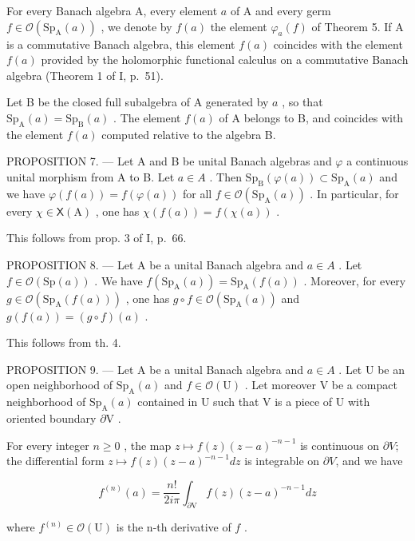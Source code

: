 For every Banach algebra A, every element \(a\) of A and every germ \(f \in \mathcal{O}(\mathrm{Sp}_{\mathrm{A}}(a))\) , we denote by \(f(a)\) the element \(\varphi_{a}(f)\) of Theorem 5. If A is a commutative Banach algebra, this element \(f(a)\) coincides with the element \(f(a)\) provided by the holomorphic functional calculus on a commutative Banach algebra (Theorem 1 of I, p.~51).

Let B be the closed full subalgebra of A generated by \(a\) , so that \(\mathrm{Sp}_{\mathrm{A}}(a) = \mathrm{Sp}_{\mathrm{B}}(a)\) . The element \(f(a)\) of A belongs to B, and coincides with the element \(f(a)\) computed relative to the algebra B.

PROPOSITION 7. --- Let A and B be unital Banach algebras and \(\varphi\) a continuous unital morphism from A to B. Let \(a \in A\) . Then \(\mathrm{Sp}_{\mathrm{B}}(\varphi(a)) \subset \mathrm{Sp}_{\mathrm{A}}(a)\) and we have \(\varphi(f(a)) = f(\varphi(a))\) for all \(f \in \mathcal{O}(\mathrm{Sp}_{\mathrm{A}}(a))\) . In particular, for every \(\chi \in \mathsf{X}(\mathrm{A})\) , one has \(\chi(f(a)) = f(\chi(a))\) .

This follows from prop. 3 of I, p.~66.

PROPOSITION 8. --- Let A be a unital Banach algebra and \(a \in A\) . Let \(f \in \mathcal{O}(\mathrm{Sp}(a))\) . We have \(f(\mathrm{Sp}_{\mathrm{A}}(a)) = \mathrm{Sp}_{\mathrm{A}}(f(a))\) . Moreover, for every \(g \in \mathcal{O}(\mathrm{Sp}_{\mathrm{A}}(f(a)))\) , one has \(g \circ f \in \mathcal{O}(\mathrm{Sp}_{\mathrm{A}}(a))\) and \(g(f(a)) = (g \circ f)(a)\) .

This follows from th. 4.

PROPOSITION 9. --- Let A be a unital Banach algebra and \(a \in A\) . Let U be an open neighborhood of \(\mathrm{Sp}_{\mathrm{A}}(a)\) and \(f \in \mathcal{O}(\mathrm{U})\) . Let moreover V be a compact neighborhood of \(\mathrm{Sp}_{\mathrm{A}}(a)\) contained in U such that V is a piece of U with oriented boundary \(\partial\mathrm{V}\) .

For every integer \(n \geqslant 0\) , the map \(z \mapsto f(z)(z - a)^{-n-1}\) is continuous on \(\partial V\); the differential form \(z \mapsto f(z)(z - a)^{-n-1} dz\) is integrable on \(\partial V\), and we have

\[
f ^ {(n)} (a) = \frac {n !}{2 i \pi} \int_ {\partial \mathrm{V}} f (z) (z - a) ^ {- n - 1} d z\tag{7}
\]

where \(f^{(n)}\in\mathcal{O}(\mathrm{U})\) is the n-th derivative of \(f\) .


